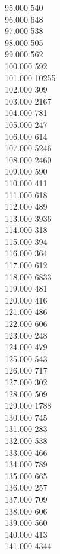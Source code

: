 { 95.000	540 \\
 96.000	648 \\
 97.000	538 \\
 98.000	505 \\
 99.000	562 \\
 100.000	592 \\
 101.000	10255 \\
 102.000	309 \\
 103.000	2167 \\
 104.000	781 \\
 105.000	247 \\
 106.000	614 \\
 107.000	5246 \\
 108.000	2460 \\
 109.000	590 \\
 110.000	411 \\
 111.000	618 \\
 112.000	489 \\
 113.000	3936 \\
 114.000	318 \\
 115.000	394 \\
 116.000	364 \\
 117.000	612 \\
 118.000	6833 \\
 119.000	481 \\
 120.000	416 \\
 121.000	486 \\
 122.000	606 \\
 123.000	248 \\
 124.000	479 \\
 125.000	543 \\
 126.000	717 \\
 127.000	302 \\
 128.000	509 \\
 129.000	1788 \\
 130.000	745 \\
 131.000	283 \\
 132.000	538 \\
 133.000	466 \\
 134.000	789 \\
 135.000	665 \\
 136.000	257 \\
 137.000	709 \\
 138.000	606 \\
 139.000	560 \\
 140.000	413 \\
 141.000	4344 \\
}
